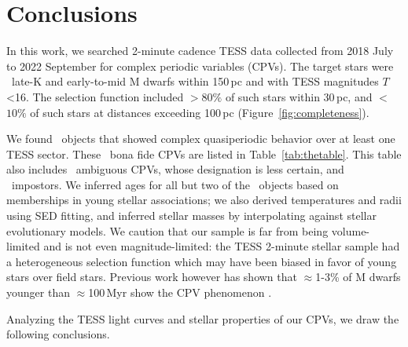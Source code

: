 \documentclass[11pt,twocolumn,tighten]{aastex63}
\begin{document}
\section{Conclusions}
\label{sec:conclusion}

In this work, we searched 2-minute cadence TESS data collected from
2018 July to 2022 September for complex periodic variables (CPVs).
The target stars were \nstarssearched\ late-K and early-to-mid M
dwarfs within 150\,pc and with TESS magnitudes $T$<16.  The selection
function included $>$$80\%$ of such stars within 30\,pc, and $<$$10\%$
of such stars at distances exceeding 100\,pc
(Figure~\ref{fig:completeness}).

We found \ngoods\ objects that showed complex quasiperiodic behavior
over at least one TESS sector.  These \ngoods\ bona fide CPVs are
listed in Table~\ref{tab:thetable}.  This table also includes
\nmaybes\ ambiguous CPVs, whose designation is less certain, and
\ndebunked\ impostors.  We inferred ages for all but two of the
\nallcands\ objects based on memberships in young stellar
associations; we also derived temperatures and radii using SED
fitting, and inferred stellar masses by interpolating against stellar
evolutionary models.  We caution that our sample is far from being
volume-limited and is not even magnitude-limited: the TESS 2-minute
stellar sample had a heterogeneous selection function which may have
been biased in favor of young stars over field stars.  Previous work
however has shown that $\approx$1-3\% of M dwarfs younger than
$\approx$100\,Myr show the CPV phenomenon
\citep{2016AJ....152..114R,2022AJ....163..144G,2022AJ....164...80R}.

Analyzing the TESS light curves and stellar properties of our CPVs, we
draw the following conclusions.
\end{document}
